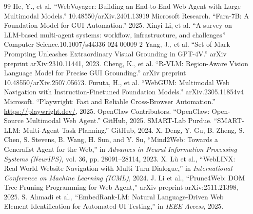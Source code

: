 \documentclass{SYSUReport}
\begin{document}
\begin{thebibliography}{99}
 He, Y., et al. “WebVoyager: Building an End-to-End Web Agent with Large Multimodal Models.” 10.48550/arXiv.2401.13919
 Microsoft Research. “Fara-7B: A Foundation Model for GUI Automation.” 2025.
 Xinyi Li, et al. “A survey on LLM-based multi-agent systems: workflow, infrastructure, and challenges”  Computer Science.10.1007/s44336-024-00009-2
 Yang, J., et al. “Set-of-Mark Prompting Unleashes Extraordinary Visual Grounding in GPT-4V.” arXiv preprint arXiv:2310.11441, 2023.
 Cheng, K., et al. “R-VLM: Region-Aware Vision Language Model for Precise GUI Grounding.” arXiv preprint 10.48550/arXiv.2507.05673.
 Furuta, H., et al. “WebGUM: Multimodal Web Navigation with Instruction-Finetuned Foundation Models.” arXiv.2305.11854v4
 Microsoft. “Playwright: Fast and Reliable Cross-Browser Automation.” \url{https://playwright.dev/}, 2025.
 OpenClaw Contributors. “OpenClaw: Open-Source Multimodal Web Agent.” GitHub, 2025.
 SMART-Lab Purdue. “SMART-LLM: Multi-Agent Task Planning.” GitHub, 2024.
 X. Deng, Y. Gu, B. Zheng, S. Chen, S. Stevens, B. Wang, H. Sun, and Y. Su, “Mind2Web: Towards a Generalist Agent for the Web,” in \textit{Advances in Neural Information Processing Systems (NeurIPS)}, vol. 36, pp. 28091–28114, 2023.
 X. Lù et al., “WebLINX: Real-World Website Navigation with Multi-Turn Dialogue,” in \textit{International Conference on Machine Learning (ICML)}, 2024.
 J. Li et al., “Prune4Web: DOM Tree Pruning Programming for Web Agent,” arXiv preprint arXiv:2511.21398, 2025.
 S. Ahmadi et al., “EmbedRank-LM: Natural Language-Driven Web Element Identification for Automated UI Testing,” in \textit{IEEE Access}, 2025.
\end{thebibliography}
\end{document}
